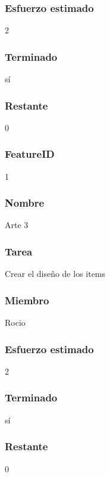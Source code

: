 \subsubsection{Esfuerzo estimado} 2
\subsubsection{Terminado} sí
\subsubsection{Restante} 0


\subsubsection{FeatureID} 1
\subsubsection{Nombre} Arte 3
\subsubsection{Tarea} Crear el diseño de los items
\subsubsection{Miembro} Rocio
\subsubsection{Esfuerzo estimado} 2
\subsubsection{Terminado} sí
\subsubsection{Restante} 0